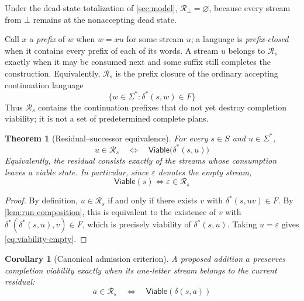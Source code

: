 \documentclass[11pt]{article}
\newtheorem{theorem}{Theorem}[section]
\newtheorem{corollary}[corollary]{Corollary}
\theoremstyle{definition}
\newcommand{\States}{S}
\newcommand{\Additions}{\Sigma}
\newcommand{\Accept}{F}
\newcommand{\Run}{\delta^{*}}
\newcommand{\Viable}{\mathsf{Viable}}
\newcommand{\Residual}{\mathcal R}
\newcommand{\eps}{\varepsilon}
\begin{document}
Under the dead-state totalization of \cref{sec:model}, $\Residual_{\bot}=\varnothing$, because every stream from $\bot$ remains at the nonaccepting dead state.

Call $x$ a \emph{prefix} of $w$ when $w=xu$ for some stream $u$; a language is \emph{prefix-closed} when it contains every prefix of each of its words. A stream $u$ belongs to $\Residual_s$ exactly when it may be consumed next and some suffix still completes the construction. Equivalently, $\Residual_s$ is the prefix closure of the ordinary accepting continuation language
\[
  \{w\in\Additions^*: \Run(s,w)\in\Accept\}
\]
Thus $\Residual_s$ contains the continuation prefixes that do not yet destroy completion viability; it is not a set of predetermined complete plans.

\begin{theorem}[Residual--successor equivalence]\label{thm:residual-successor}
For every $s\in\States$ and $u\in\Additions^*$,
\begin{equation}\label{eq:residual-successor}
  \boxed{
  u\in\Residual_s
  \quad\Longleftrightarrow\quad
  \Viable\bigl(\Run(s,u)\bigr)}
\end{equation}
Equivalently, the residual consists exactly of the streams whose consumption leaves a viable state. In particular, since $\eps$ denotes the empty stream,
\begin{equation}\label{eq:viability-empty}
  \Viable(s)\Longleftrightarrow \eps\in\Residual_s
\end{equation}
\end{theorem}

\begin{proof}
By definition, $u\in\Residual_s$ if and only if there exists $v$ with $\Run(s,uv)\in\Accept$. By \cref{lem:run-composition}, this is equivalent to the existence of $v$ with $\Run(\Run(s,u),v)\in\Accept$, which is precisely viability of $\Run(s,u)$. Taking $u=\eps$ gives \eqref{eq:viability-empty}.
\end{proof}

\begin{corollary}[Canonical admission criterion]\label{cor:canonical-admission}
A proposed addition $a$ preserves completion viability exactly when its one-letter stream belongs to the current residual:
\begin{equation}\label{eq:canonical-admission}
  \boxed{
  a\in\Residual_s
  \quad\Longleftrightarrow\quad
  \Viable(\delta(s,a))}
\end{equation}
\end{corollary}
\end{document}
